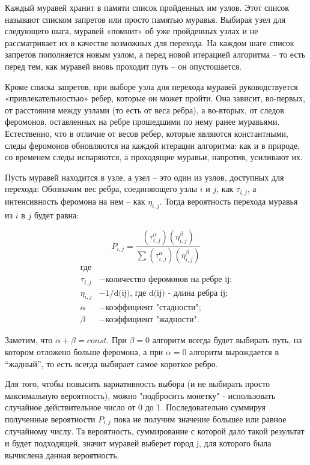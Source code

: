 \documentclass[a4paper, 14pt]{article}
\begin{document}
Каждый муравей хранит в памяти список пройденных им узлов. Этот список называют списком запретов  или просто памятью муравья. Выбирая узел для следующего шага, муравей «помнит» об уже пройденных узлах и не рассматривает их в качестве возможных для перехода. На каждом шаге список запретов пополняется новым узлом, а перед новой итерацией алгоритма – то есть перед тем, как муравей вновь проходит путь – он опустошается.

Кроме списка запретов, при выборе узла для перехода муравей руководствуется «привлекательностью» ребер, которые он может пройти. Она зависит, во-первых, от расстояния между узлами (то есть от веса ребра), а во-вторых, от следов феромонов, оставленных на ребре прошедшими по нему ранее муравьями. Естественно, что в отличие от весов ребер, которые являются константными, следы феромонов обновляются на каждой итерации алгоритма: как и в природе, со временем следы испаряются, а проходящие муравьи, напротив, усиливают их.

Пусть муравей находится в узле, а узел  –  это один из узлов, доступных для перехода:  Обозначим вес ребра, соединяющего узлы $i$ и $j$, как  $\tau _{i,j}$, а интенсивность феромона на нем – как $\eta _{i,j}$. Тогда вероятность перехода муравья из $i$ в $j$ будет равна:

\begin{equation}\label{form:way} 
 P_{i,j}={\frac {(\tau _{i,j}^{\alpha })(\eta _{i,j}^{\beta })}{\sum (\tau _{i,j}^{\alpha })(\eta _{i,j}^{\beta })}}
 \end{equation}
 \begin{align*}
    \text{где} \\
   \tau _{i,j} &- \text{количество феромонов на ребре ij;} \\
    \eta _{i,j} &- \text{1/d(ij), где d(ij) - длина ребра ij;} \\
    \alpha &- \text{коэффициент "стадности";} \\
    \beta &- \text{коэффициент "жадности".}
\end{align*}

Заметим, что  $\alpha+\beta=const$. При {$\beta = 0$} алгоритм всегда будет выбирать путь, на котором отложено больше феромона, а при {$\alpha = 0$} алгоритм вырождается в “жадный”, то есть всегда выбирает самое короткое ребро.

Для того, чтобы повысить вариативность выбора (и не выбирать просто максимальную вероятность), можно "подбросить монетку" -  использовать случайное действительное число от 0 до 1. Последовательно суммируя полученные вероятности $P_{i,j}$ пока не получим значение большее или равное случайному числу. Та вероятность, суммирование с которой дало такой результат и будет подходящей, значит муравей выберет город j, для которого была вычислена данная вероятность.
\end{document}
